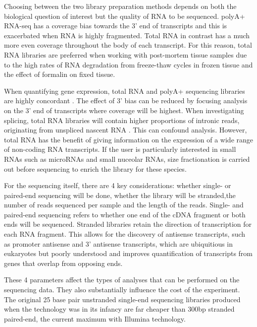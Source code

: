 Choosing between the two library preparation methods depends on both the biological question of interest but the quality of RNA to be sequenced.
polyA+ RNA-seq has a coverage bias towards the 3' end of transcripts and this is exacerbated when RNA is highly fragmented.  
Total RNA in contrast has a much more even coverage throughout the body of each transcript.
For this reason, total RNA libraries are preferred when working with post-mortem tissue samples due to the high rates of RNA degradation from freeze-thaw cycles in frozen tissue and the effect of formalin on fixed tissue.

When quantifying gene expression, total RNA and polyA+ sequencing libraries are highly concordant \citep{Cui2010,Zhao2018}. 
The effect of 3' bias can be reduced by focusing analysis on the 3' end of transcripts where coverage will be highest. 
When investigating splicing, total RNA libraries will contain higher proportions of intronic reads, originating from unspliced nascent RNA \citep{Ameur2011}.
This can confound analysis. 
However, total RNA has the benefit of giving information on the expression of a wide range of non-coding RNA transcripts. 
If the user is particularly interested in small RNAs such as microRNAs and small nuceolar RNAs, size fractionation is carried out before sequencing to enrich the library for these species.

For the sequencing itself, there are 4 key considerations: whether single- or paired-end sequencing will be done, whether the library will be stranded,the number of reads sequenced per sample and the length of the reads.
Single- and paired-end sequencing refers to whether one end of the cDNA fragment or both ends will be sequenced.
Stranded libraries retain the direction of transcription for each RNA fragment.
This allows for the discovery of antisense transcripts, such as promoter antisense and 3' antisense transcripts, which are ubiquitious in eukaryotes but poorly understood \citep{Lavorgna2004} and improves quantification of transcripts from genes that overlap from opposing ends. 

These 4 parameters affect the types of analyses that can be performed on the sequencing data.
They also substantially influence the cost of the experiment.
The original 25 base pair unstranded single-end sequencing libraries produced when the technology was in its infancy \citep{Mortazavi2008} are far cheaper than 300bp stranded paired-end, the current maximum with Illumina technology. 

